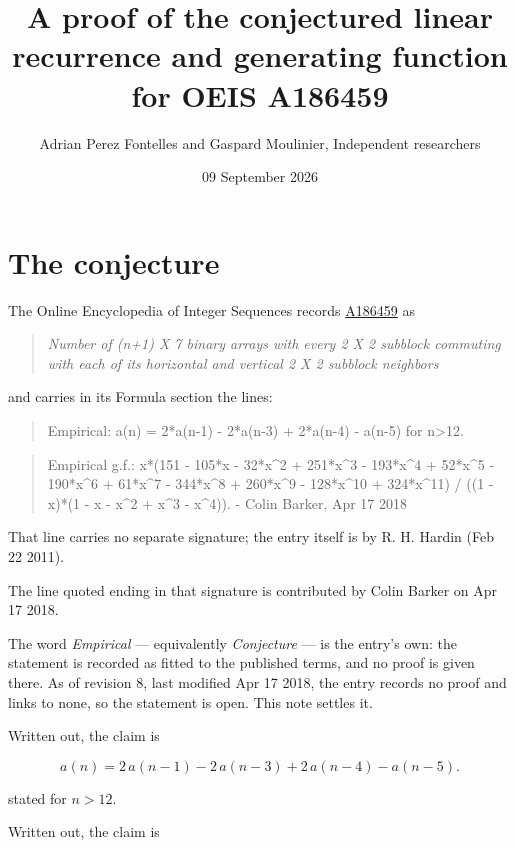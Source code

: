 \documentclass[11pt]{article}
\title{A proof of the conjectured linear recurrence and generating function for OEIS A186459}
\author{Adrian Perez Fontelles and Gaspard Moulinier, Independent researchers}
\date{09 September 2026}
\theoremstyle{definition}
\begin{document}
\maketitle
\section{The conjecture}

The Online Encyclopedia of Integer Sequences records \href{https://oeis.org/A186459}{A186459} as

\begin{quote}\itshape Number of (n+1) X 7 binary arrays with every 2 X 2 subblock commuting with each of its horizontal and vertical 2 X 2 subblock neighbors\end{quote}

and carries in its Formula section the lines:

\begin{quote}\ttfamily Empirical: a(n) = 2*a(n-1) - 2*a(n-3) + 2*a(n-4) - a(n-5) for n>12.\end{quote}

\begin{quote}\ttfamily Empirical g.f.: x*(151 - 105*x - 32*x\textasciicircum{}2 + 251*x\textasciicircum{}3 - 193*x\textasciicircum{}4 + 52*x\textasciicircum{}5 - 190*x\textasciicircum{}6 + 61*x\textasciicircum{}7 - 344*x\textasciicircum{}8 + 260*x\textasciicircum{}9 - 128*x\textasciicircum{}10 + 324*x\textasciicircum{}11) / ((1 - x)*(1 - x - x\textasciicircum{}2 + x\textasciicircum{}3 - x\textasciicircum{}4)). - Colin Barker, Apr 17 2018\end{quote}

That line carries no separate signature; the entry itself is by R. H. Hardin (Feb 22 2011).

The line quoted ending in that signature is contributed by Colin Barker on Apr 17 2018.

The word {\itshape Empirical} --- equivalently {\itshape Conjecture} --- is the entry's own: the statement is recorded as fitted to the published terms, and no proof is given there. As of revision 8, last modified Apr 17 2018, the entry records no proof and links to none, so the statement is open. This note settles it.

Written out, the claim is

\[a(n) = 2\,a(n-1) - 2\,a(n-3) + 2\,a(n-4) - a(n-5).\]

stated for $n > 12$.

Written out, the claim is
\end{document}
